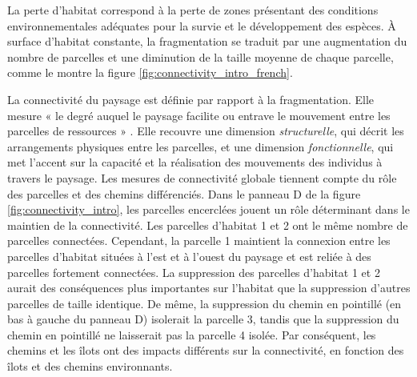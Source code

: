 \clearpage
\begin{tcolorbox}[breakable, 
colback =verylightgray, 
colframe=gray!75!black,
title={Encadré 2 - Habitat : perte, fragmentation et connectivité},
fontupper=\small]
\par 
\justifying

La perte d'habitat correspond à la perte de zones présentant des conditions environnementales adéquates pour la survie et le développement des espèces. À surface d'habitat constante, la fragmentation se traduit par une augmentation du nombre de parcelles et une diminution de la taille moyenne de chaque parcelle, comme le montre la figure \ref{fig:connectivity_intro_french}. 

La connectivité du paysage est définie par rapport à la fragmentation. Elle mesure « le degré auquel le paysage facilite ou entrave le mouvement entre les parcelles de ressources » \citep{taylor_connectivity_1993}. 
Elle recouvre une dimension \textit{structurelle}, qui décrit les arrangements physiques entre les parcelles, et une dimension \textit{fonctionnelle}, qui met l'accent sur la capacité et la réalisation des mouvements des individus à travers le paysage. Les mesures de connectivité globale tiennent compte du rôle des parcelles et des chemins différenciés. Dans le panneau D de la figure \ref{fig:connectivity_intro}, les parcelles encerclées jouent un rôle déterminant dans le maintien de la connectivité. Les parcelles d'habitat 1 et 2 ont le même nombre de parcelles connectées. Cependant, la parcelle 1 maintient la connexion entre les parcelles d'habitat situées à l'est et à l'ouest du paysage et est reliée à des parcelles fortement connectées. La suppression des parcelles d'habitat 1 et 2 aurait des conséquences plus importantes sur l'habitat que la suppression d'autres parcelles de taille identique. De même, la suppression du chemin en pointillé (en bas à gauche du panneau D) isolerait la parcelle 3, tandis que la suppression du chemin en pointillé ne laisserait pas la parcelle 4 isolée. Par conséquent, les chemins et les îlots ont des impacts différents sur la connectivité, en fonction des îlots et des chemins environnants.


\end{tcolorbox}
